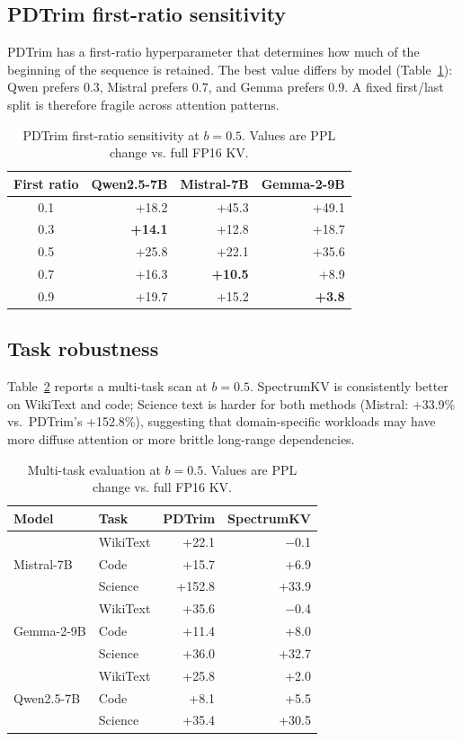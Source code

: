 \documentclass[11pt]{article}
\newcommand{\method}{SpectrumKV}
\newcommand{\budget}{b}
\newcommand{\pct}{\%}
\theoremstyle{plain}
\theoremstyle{definition}
\begin{document}
\subsection{PDTrim first-ratio sensitivity}
PDTrim has a first-ratio hyperparameter that determines how much of the beginning of the sequence is retained.  The best value differs by model (Table~\ref{tab:fr}): Qwen prefers 0.3, Mistral prefers 0.7, and Gemma prefers 0.9.  A fixed first/last split is therefore fragile across attention patterns.

\begin{table}[h]
\centering
\caption{PDTrim first-ratio sensitivity at $\budget=0.5$.  Values are PPL change vs. full FP16 KV.}
\label{tab:fr}
\small
\begin{tabular}{crrr}
\toprule
First ratio & Qwen2.5-7B & Mistral-7B & Gemma-2-9B \\
\midrule
0.1 & +18.2 & +45.3 & +49.1 \\
0.3 & \textbf{+14.1} & +12.8 & +18.7 \\
0.5 & +25.8 & +22.1 & +35.6 \\
0.7 & +16.3 & \textbf{+10.5} & +8.9 \\
0.9 & +19.7 & +15.2 & \textbf{+3.8} \\
\bottomrule
\end{tabular}
\end{table}

\subsection{Task robustness}
Table~\ref{tab:tasks} reports a multi-task scan at $\budget=0.5$.  \method{} is consistently better on WikiText and code; Science text is harder for both methods (Mistral: +33.9\pct{} vs.\ PDTrim's +152.8\pct{}), suggesting that domain-specific workloads may have more diffuse attention or more brittle long-range dependencies.

\begin{table}[h]
\centering
\caption{Multi-task evaluation at $\budget=0.5$.  Values are PPL change vs. full FP16 KV.}
\label{tab:tasks}
\small
\begin{tabular}{llrr}
\toprule
Model & Task & PDTrim & \method{} \\
\midrule
\multirow{3}{*}{Mistral-7B} & WikiText & +22.1 & $-$0.1 \\
 & Code & +15.7 & +6.9 \\
 & Science & +152.8 & +33.9 \\
\midrule
\multirow{3}{*}{Gemma-2-9B} & WikiText & +35.6 & $-$0.4 \\
 & Code & +11.4 & +8.0 \\
 & Science & +36.0 & +32.7 \\
\midrule
\multirow{3}{*}{Qwen2.5-7B} & WikiText & +25.8 & +2.0 \\
 & Code & +8.1 & +5.5 \\
 & Science & +35.4 & +30.5 \\
\bottomrule
\end{tabular}
\end{table}
\end{document}
